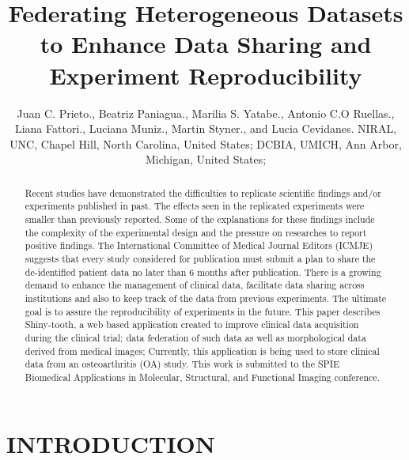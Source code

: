 \documentclass[]{spie}  %
\title{Federating Heterogeneous Datasets to Enhance Data Sharing and Experiment Reproducibility}
\author{Juan C. Prieto.\supit{a}, Beatriz Paniagua.\supit{a}, Marilia S. Yatabe.\supit{b}, Antonio C.O Ruellas.\supit{b}, 
Liana Fattori.\supit{b}, Luciana Muniz.\supit{b}, Martin Styner.\supit{a}, and Lucia Cevidanes.\supit{c}
\skiplinehalf
\supit{a}NIRAL, UNC, Chapel Hill, North Carolina, United States; 
\supit{b}DCBIA, UMICH, Ann Arbor, Michigan, United States;
}
\begin{document}
 
  \maketitle 

\begin{abstract}

Recent studies have demonstrated the difficulties to replicate scientific findings and/or experiments published in past\cite{open2015estimating}. 
The effects seen in the replicated experiments were smaller than previously reported. Some of the explanations 
for these findings include the complexity of the experimental design and the pressure on researches to report positive findings. 
The International Committee of Medical Journal Editors (ICMJE) suggests that every study considered for publication must 
submit a plan to share the de-identified patient data no later than 6 months after publication. 
There is a growing demand to enhance the management of clinical data, facilitate data sharing across institutions and also to keep track 
of the data from previous experiments. The ultimate goal is to assure the reproducibility of experiments in the future.
This paper describes Shiny-tooth, a web based application created to improve clinical data acquisition during the clinical trial; 
data federation of such data as well as morphological data derived from medical images; 
Currently, this application is being used to store clinical data from an osteoarthritis (OA) study. 
This work is submitted to the SPIE Biomedical Applications in Molecular, Structural, and Functional Imaging conference.

\end{abstract}



\section{INTRODUCTION}
\label{sec:intro}
\end{document}
